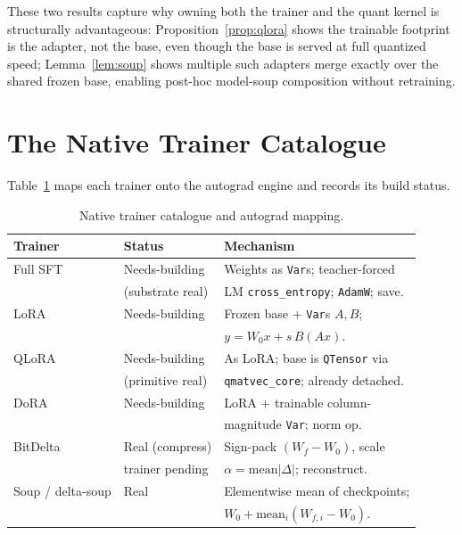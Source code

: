\documentclass[11pt]{article}
\begin{document}
These two results capture why owning both the trainer and the quant kernel is structurally advantageous: Proposition~\ref{prop:qlora} shows the trainable footprint is the adapter, not the base, even though the base is served at full quantized speed; Lemma~\ref{lem:soup} shows multiple such adapters merge exactly over the shared frozen base, enabling post-hoc model-soup composition without retraining.

\section{The Native Trainer Catalogue}
\label{sec:catalogue}

Table~\ref{tab:catalogue} maps each trainer onto the autograd engine and records its build status.

\begin{table}[t]
\centering
\small
\caption{Native trainer catalogue and autograd mapping.}
\label{tab:catalogue}
\begin{tabular}{@{}lll@{}}
\toprule
\textbf{Trainer} & \textbf{Status} & \textbf{Mechanism} \\
\midrule
Full SFT & Needs-building & Weights as \texttt{Var}s; teacher-forced \\
         & (substrate real) & LM \texttt{cross\_entropy}; \texttt{AdamW}; save. \\
LoRA & Needs-building & Frozen base $+$ \texttt{Var}s $A,B$; \\
     &                & $y = W_0 x + s\,B(Ax)$. \\
QLoRA & Needs-building & As LoRA; base is \texttt{QTensor} via \\
      & (primitive real) & \texttt{qmatvec\_core}; already detached. \\
DoRA & Needs-building & LoRA $+$ trainable column- \\
     &                & magnitude \texttt{Var}; norm op. \\
BitDelta & Real (compress) & Sign-pack $(W_{\!f}-W_0)$, scale \\
         & trainer pending  & $\alpha = \mathrm{mean}|\Delta|$; reconstruct. \\
Soup / delta-soup & Real & Elementwise mean of checkpoints; \\
                  &      & $W_0 + \mathrm{mean}_i(W_{\!f,i}-W_0)$. \\
\bottomrule
\end{tabular}
\end{table}
\end{document}
